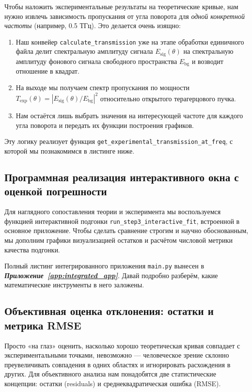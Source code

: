 Чтобы наложить экспериментальные результаты на теоретические кривые, нам нужно извлечь зависимость пропускания от угла поворота для \textit{одной конкретной частоты} (например, 0.5 ТГц). Это делается очень изящно:
\begin{enumerate}
    \item Наш конвейер \texttt{calculate\_transmission} уже на этапе обработки единичного файла делит спектральную амплитуду сигнала $E_{\text{sig}}(\theta)$ на спектральную амплитуду фонового сигнала свободного пространства $E_{\text{bg}}$ и возводит отношение в квадрат.
    \item На выходе мы получаем спектр пропускания по мощности $T_{\text{exp}}(\theta) = \left| E_{\text{sig}}(\theta) / E_{\text{bg}} \right|^2$ относительно открытого терагерцового пучка.
    \item Нам остаётся лишь выбрать значения на интересующей частоте для каждого угла поворота и передать их функции построения графиков.
\end{enumerate}
Эту логику реализует функция \texttt{get\_experimental\_transmission\_at\_freq}, с которой мы познакомимся в листинге ниже.

\subsection{Программная реализация интерактивного окна с оценкой погрешности}

Для наглядного сопоставления теории и эксперимента мы воспользуемся функцией интерактивной подгонки \texttt{run\_step3\_interactive\_fit}, встроенной в основное приложение. Чтобы сделать сравнение строгим и научно обоснованным, мы дополним графики визуализацией остатков и расчётом числовой метрики качества подгонки.

Полный листинг интегрированного приложения \texttt{main.py} вынесен в \textbf{\textit{Приложение~\ref{app:integrated_app}}}. Давай подробно разберём, какие математические инструменты в него заложены.

\subsection{Объективная оценка отклонения: остатки и метрика RMSE}

Просто «на глаз» оценить, насколько хорошо теоретическая кривая совпадает с экспериментальными точками, невозможно — человеческое зрение склонно преувеличивать совпадения в одних областях и игнорировать расхождения в других. Для объективного анализа нам понадобятся две статистические концепции: остатки (residuals) и среднеквадратическая ошибка (RMSE).

